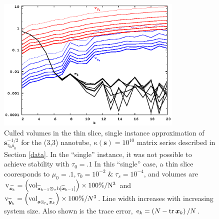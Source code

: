 \documentclass[letterpaper,twocolumn,amsmath,amsfont,amssymb,english,aps,jcp,preprintnumbers,groupaddress,nofootinbib,tightenlines,floatfix]{revtex4}
\newcommand{\mat}[1]{\boldsymbol{#1}}
\newcommand{\ot}{  {\scriptstyle \otimes}_{ \tau } }
\newcommand{\ots}{ {\scriptstyle \otimes}_{ \! \tau_s } }
\theoremstyle{plain}
\theoremstyle{remark}
\theoremstyle{plain}
\begin{document}
\begin{figure}[h]\label{regularized_stab}
 \includegraphics[width=3.5in]{fig_33_tube_cond_10_regularized/33_tube_k10_regularized_stab.eps}
\caption{
Culled volumes in the thin slice, single instance approximation of $\mat{s}^{-1/2}_{\tau_0 \mu_0}$
for the (3,3) nanotube, $\kappa(\mat{s})=10^{10}$ matrix series 
described in Section \ref{data}.  In the ``single'' instance, it was not possible to achieve stability with $\tau_0=.1$
In this ``single'' case, a thin slice cooresponds to $\mu_0=.1, \tau_0=10^{-2} \;  \&  \; \tau_s=10^{-4}$, and volumes are
$\rm v_{\widetilde{\mat{z}_k}} = \left( {\rm vol}_{ \widetilde{\mat{z}}_{k-1}\ot h[\widetilde{\mat{x}}_{k-1}] } \right) \times 100\% /N^3$ and
${\rm v}_{\widetilde{\mat{y}}_k} = \left( {\rm vol}_{\mat{s}  \ots  \widetilde{\mat{z}}_{k}} \right) \times 100\% /N^3$.    
Line width increases with increasing system size. 
Also shown is the trace error, ${\rm e}_{k} = \left( N-{\rm tr}\,\mat{x}_k \right)/N$.}
\end{figure} 
\end{document}
